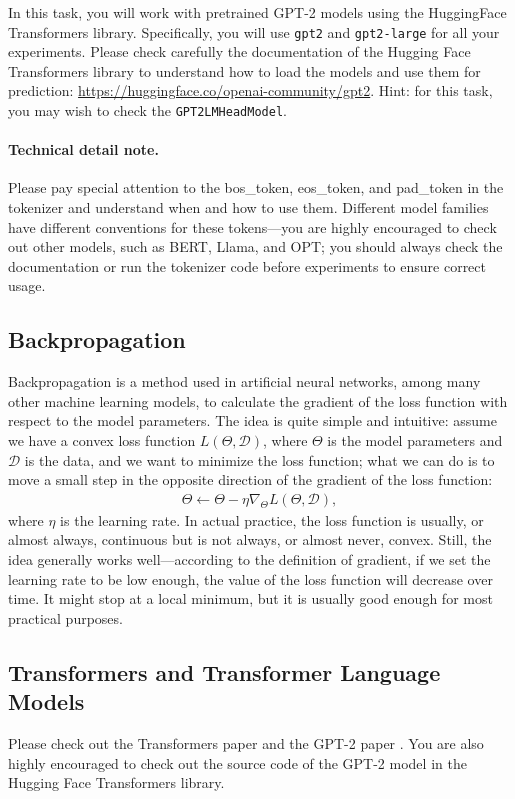 \documentclass[12pt, letterpaper]{article}
\begin{document}
In this task, you will work with pretrained GPT-2 models using the HuggingFace Transformers library.
Specifically, you will use \texttt{gpt2} and \texttt{gpt2-large} for all your experiments.
Please check carefully the documentation of the Hugging Face Transformers library to understand how to load the models and use them for prediction: \url{https://huggingface.co/openai-community/gpt2}.
Hint: for this task, you may wish to check the \texttt{GPT2LMHeadModel}.

\paragraph{Technical detail note.}
Please pay special attention to the bos\_token, eos\_token, and pad\_token in the tokenizer and understand when and how to use them.
Different model families have different conventions for these tokens---you are highly encouraged to check out other models, such as BERT, Llama, and OPT; you should always check the documentation or run the tokenizer code before experiments to ensure correct usage.

\subsection{Backpropagation}
Backpropagation is a method used in artificial neural networks, among many other machine learning models, to calculate the gradient of the loss function with respect to the model parameters.
The idea is quite simple and intuitive: assume we have a convex loss function $L(\Theta, \mathcal{D})$, where $\Theta$ is the model parameters and $\mathcal{D}$ is the data, and we want to minimize the loss function; what we can do is to move a small step in the opposite direction of the gradient of the loss function:
\begin{align*}
    \Theta \leftarrow \Theta - \eta \nabla_\Theta L(\Theta, \mathcal{D}),
\end{align*}
where $\eta$ is the learning rate.
In actual practice, the loss function is usually, or almost always, continuous but is not always, or almost never, convex.
Still, the idea generally works well---according to the definition of gradient, if we set the learning rate to be low enough, the value of the loss function will decrease over time.
It might stop at a local minimum, but it is usually good enough for most practical purposes.

\subsection{Transformers and Transformer Language Models}
Please check out the Transformers paper \citep{vaswani-etal-2017-attention} and the GPT-2 paper \citep{radford-etal-2019-language}.
You are also highly encouraged to check out the source code of the GPT-2 model in the Hugging Face Transformers library.
\end{document}
